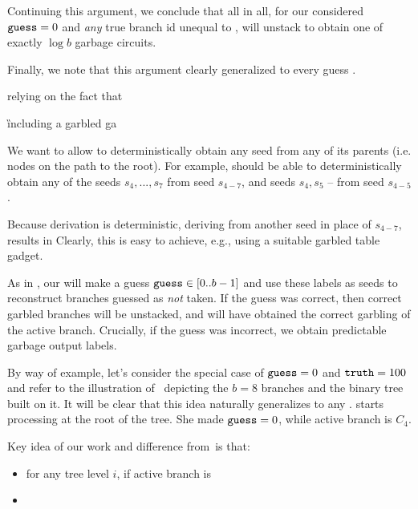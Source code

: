 Continuing this argument, we conclude that all in all, for our considered $\mathtt{guess}=0$ and {\em any} true branch id unequal to \guess, \E will unstack to obtain one of exactly $\log b$ garbage circuits.


Finally, we note  that this argument clearly generalized to every guess \guess.




\bigskip
 relying on the fact that

  \G including a garbled ga











We want to allow \E to deterministically obtain any seed from any of its parents (i.e. nodes on the path to the root).  For example, \E should be able to deterministically obtain any of the seeds $s_4,...,s_7$ from seed $s_{4-7}$, and seeds $s_4, s_5$ -- from seed $s_{4-5}$. 


 Because derivation is deterministic, deriving from another seed in place of $s_{4-7}$, results in 
Clearly, this is easy to achieve, e.g., using a suitable garbled table gadget.








 As in \HK, our \E will make a guess $\mathtt{guess}\in[0..b-1]$ and use these labels as seeds to reconstruct branches guessed as {\em not} taken.  If the guess was correct, then correct garbled branches will be unstacked, and \E will have obtained the correct garbling of the active branch.  Crucially, if the guess was incorrect, we obtain predictable garbage output labels.



By way of example, let's consider the special case of $\mathtt{guess}=0$ and $\mathtt{truth} = 100$ and refer to the illustration of~ depicting the $b=8$ branches and the binary tree built on it.  It will be clear that this idea naturally generalizes to any \guess.  \E starts processing at the root of the tree.  She made $\mathtt{guess} = 0$, while active branch is $C_4$.  



 Key idea of our work and difference from~\HK is that:
\begin{itemize}
	\item for any tree level $i$, if active branch is 
	\item 
\end{itemize}




